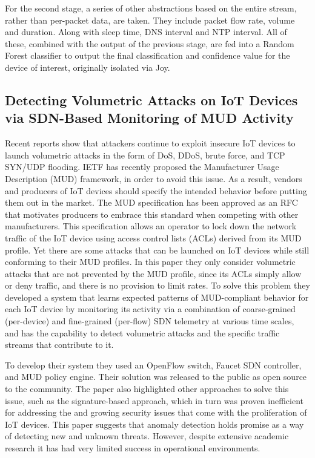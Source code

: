 \documentclass{article}
\begin{document}
For the second stage, a series of other abstractions based on the entire stream, rather than per-packet data, are taken. They include packet flow rate, volume and duration. Along with sleep time, DNS interval and NTP interval. All of these, combined with the output of the previous stage, are fed into a Random Forest classifier to output the final classification and confidence value for the device of interest, originally isolated via Joy.\pagebreak

\subsection{Detecting Volumetric Attacks on IoT Devices via SDN-Based Monitoring of MUD Activity}

Recent reports show that attackers continue to exploit insecure IoT devices to launch volumetric attacks in the form of DoS, DDoS, brute force, and TCP SYN/UDP flooding. IETF has recently proposed the Manufacturer Usage Description (MUD) framework, in order to avoid this issue. As a result, vendors and producers of IoT devices should specify the intended behavior before putting them out in the market. The MUD specification has been approved as an RFC that motivates producers to embrace this standard when competing with other manufacturers. This specification allows an operator to lock down the network traffic of the IoT device using access control lists (ACLs) derived from its MUD profile. Yet there are some attacks that can be launched on IoT devices while still conforming to their MUD profiles. In this paper \cite{DetectingVolumetricAttacks} they only consider volumetric attacks that are not prevented by the MUD profile, since its ACLs simply allow or deny traffic, and there is no provision to limit rates. To solve this problem they developed a system that learns expected patterns of MUD-compliant behavior for each IoT device by monitoring its activity via a combination of coarse-grained (per-device) and fine-grained (per-flow) SDN telemetry at various time scales, and has the capability to detect volumetric attacks and the specific traffic streams that contribute to it. \pagebreak

To develop their system they used an OpenFlow switch, Faucet SDN controller, and MUD policy engine. Their solution was released to the public as open source to the community. The paper \cite{DetectingVolumetricAttacks} also highlighted other approaches to solve this issue, such as the signature-based approach, which in turn was proven inefficient for addressing the and growing security issues that come with the proliferation of IoT devices. This paper suggests that anomaly detection holds promise as a way of detecting new and unknown threats. However, despite extensive academic research it has had very limited success in operational environments. 
\newline
\end{document}
